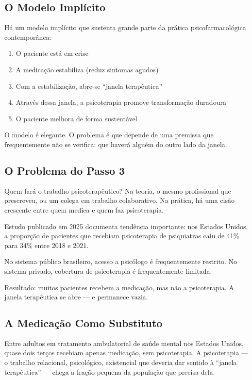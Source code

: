 \subsection{O Modelo Implícito}

Há um modelo implícito que sustenta grande parte da prática psicofarmacológica contemporânea:

\begin{enumerate}
\item O paciente está em crise
\item A medicação estabiliza (reduz sintomas agudos)
\item Com a estabilização, abre-se \enquote{janela terapêutica}
\item Através dessa janela, a psicoterapia promove transformação duradoura
\item O paciente melhora de forma sustentável
\end{enumerate}

O modelo é elegante. O problema é que depende de uma premissa que frequentemente não se verifica: que haverá alguém do outro lado da janela.

\subsection{O Problema do Passo 3}

Quem fará o trabalho psicoterapêutico? Na teoria, o mesmo profissional que prescreveu, ou um colega em trabalho colaborativo. Na prática, há uma cisão crescente entre quem medica e quem faz psicoterapia.

Estudo publicado em 2025 documenta tendência importante: nos Estados Unidos, a proporção de pacientes que recebiam psicoterapia de psiquiatras caiu de 41\% para 34\% entre 2018 e 2021.

No sistema público brasileiro, acesso a psicólogo é frequentemente restrito. No sistema privado, cobertura de psicoterapia é frequentemente limitada.

Resultado: muitos pacientes recebem a medicação, mas não a psicoterapia. A janela terapêutica se abre --- e permanece vazia.

\subsection{A Medicação Como Substituto}

Entre adultos em tratamento ambulatorial de saúde mental nos Estados Unidos, quase dois terços recebiam apenas medicação, sem psicoterapia. A psicoterapia --- o trabalho relacional, psicológico, existencial que deveria dar sentido à \enquote{janela terapêutica} --- chega a fração pequena da população que precisa dela.

